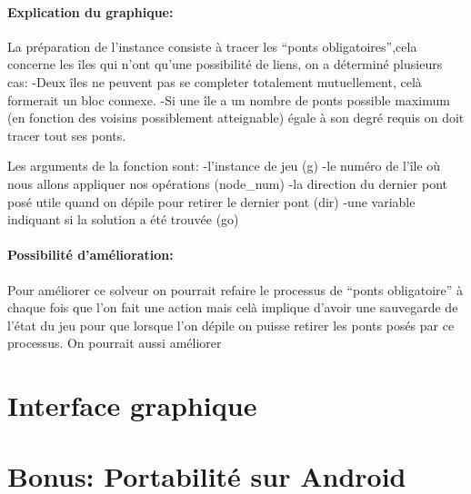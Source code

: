 \documentclass[12pt]{report}
\begin{document}
\paragraph{Explication du graphique:\newline}
La préparation de l'instance consiste à tracer les ``ponts obligatoires'',cela concerne les îles qui n'ont qu'une possibilité de liens,
on a déterminé plusieurs cas:\newline
-Deux îles ne peuvent pas se completer totalement mutuellement, celà formerait un bloc connexe.\newline
-Si une île a un nombre de ponts possible maximum (en fonction des voisins possiblement atteignable) égale à son degré requis on doit tracer tout ses ponts.\newline

Les arguments de la fonction sont:\newline
-l'instance de jeu (g)\newline
-le numéro de l'île où nous allons appliquer nos opérations (node\_num)\newline
-la direction du dernier pont posé utile quand on dépile pour retirer le dernier pont (dir)\newline
-une variable indiquant si la solution a été trouvée (go)\newline

\paragraph{Possibilité d'amélioration:\newline}
Pour améliorer ce solveur on pourrait refaire le processus de ``ponts obligatoire'' à chaque fois que l'on fait une action mais celà implique d'avoir une sauvegarde de l'état du jeu pour que lorsque l'on dépile on puisse retirer les ponts posés par ce processus. On pourrait aussi améliorer 

\newpage
\section{Interface graphique}
\newpage
\section{Bonus: Portabilité sur Android}
\newpage
\end{document}
